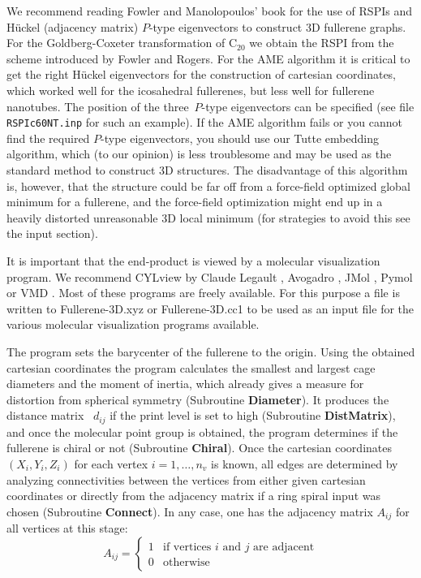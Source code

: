 \documentclass[article,a4paper,twoside]{memoir}
\newcommand{\C}[1]{\ensuremath{\mathrm{C}_{#1}}}
\newcommand{\filename}[1]{\texttt{#1}}
\newcommand{\funname}[1]{{\color{blue}\textbf{#1}}}
\begin{document}
We recommend reading Fowler and Manolopoulos' book \cite{Atlas,cvetkovic2002} for
the use of RSPIs and H\"uckel (adjacency matrix) $P$-type eigenvectors to construct
3D fullerene graphs.  For the Goldberg-Coxeter transformation of \C{20} we obtain
the RSPI from the scheme introduced by Fowler and Rogers.\cite{Rogers}  For the AME
algorithm it is critical to get the right H\"uckel eigenvectors for the construction
of cartesian coordinates,\cite{Atlas} which worked well for the icosahedral fullerenes,
but less well for fullerene nanotubes.  The position of the three~$P$-type eigenvectors
can be specified (see file \filename{RSPIc60NT.inp} for such an example).  If the
AME algorithm fails or you cannot find the required $P$-type eigenvectors, you should
use our Tutte embedding algorithm, which (to our opinion) is less troublesome and
may be used as the standard method to construct 3D structures.  The disadvantage
of this algorithm is, however, that the structure could be far off from a force-field
optimized global minimum for a fullerene, and the force-field optimization might
end up in a heavily distorted unreasonable 3D local minimum (for strategies to avoid
this see the input section).

It is important that the end-product is viewed by a molecular
visualization program.  We recommend CYLview by Claude Legault
\cite{CYLview}, Avogadro \cite{Avogadro}, JMol \cite{JMol}, Pymol
\cite{Pymol} or VMD \cite{vmd}.  Most of these programs are freely
available.  For this purpose a file is written to Fullerene-3D.xyz or
Fullerene-3D.cc1 to be used as an input file for the various molecular
visualization programs available.

The program sets the barycenter of the fullerene 
to the origin. Using the obtained cartesian coordinates the program calculates the smallest and largest cage diameters and the
moment of inertia, which already gives a measure for distortion from spherical symmetry (Subroutine \funname{Diameter}). 
It produces the distance matrix~ $d_{ij}$ if the print level is set to high (Subroutine \funname{DistMatrix}), and once the 
molecular point group is obtained, the program determines if the fullerene is chiral or not (Subroutine \funname{Chiral}).
Once the cartesian coordinates $(X_i, Y_i, Z_i)$ for each vertex $i=1,\dots, n_v$ is known, all edges are determined by 
analyzing connectivities between the vertices from either given cartesian coordinates or directly from the adjacency matrix 
if a ring spiral input was chosen (Subroutine \funname{Connect}). In any case, one has the adjacency matrix $A_{ij}$ for all vertices at this stage:
\begin{equation}
  \label{eq:adjacencymatrix}
  A_{ij} =
  \begin{cases}
    1 & \text{if vertices $i$ and $j$ are adjacent}\\
    0 & \text{otherwise}
  \end{cases}
\end{equation}
\end{document}
